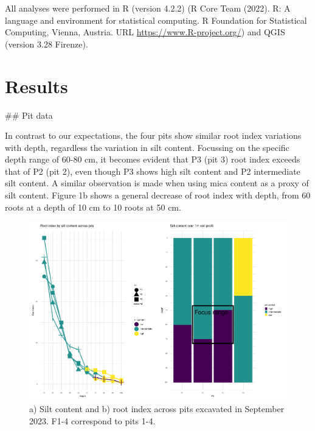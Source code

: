 \documentclass[fleqn,10pt]{latex/stylish_article} %
\begin{document}
All analyses were performed in R (version 4.2.2) (R Core Team (2022). R: A language and environment for statistical computing. R Foundation for Statistical Computing, Vienna, Austria. URL \url{https://www.R-project.org/}) and QGIS (version 3.28 Firenze).

\hypertarget{results}{%
\section{Results}\label{results}}

\scriptsize

\normalsize
\#\# Pit data

In contrast to our expectations, the four pits show similar root index variations with depth, regardless the variation in silt content. Focussing on the specific depth range of 60-80 cm, it becomes evident that P3 (pit 3) root index exceeds that of P2 (pit 2), even though P3 shows high silt content and P2 intermediate silt content. A similar observation is made when using mica content as a proxy of silt content. Figure 1b shows a general decrease of root index with depth, from 60 roots at a depth of 10 cm to 10 roots at 50 cm.



\scriptsize

\begin{figure}

{\centering \includegraphics[width=0.8\linewidth,]{pedoP16-report_files/figure-latex/pit-1} 

}

\caption{a) Silt content and b) root index across pits excavated in September 2023. F1-4 correspond to pits 1-4.}\label{fig:pit}
\end{figure}

\normalsize
\end{document}
